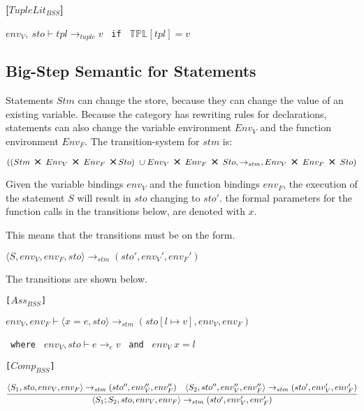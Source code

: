 \textbf{[$TupleLit_{BSS}$]}\\
\begin{center}
	\begin{math}
	env_V,\ sto \vdash tpl \rightarrow_{tuple} v
	\end{math}
	\texttt{ if } $\mathbb{TPL}[tpl] = v$
\end{center}

\subsection{Big-Step Semantic for Statements}
Statements $Stm$ can change the store, because they can change the value of an existing variable.
Because the category has rewriting rules for declarations, statements can also change the variable environment $Env_V$ and the function environment $Env_F$.
The transition-system for $stm$ is:
\begin{center}
	$((Stm\ \Cross\ Env_V\ \Cross\ Env_F\ \Cross Sto)\ \cup Env_V\ \Cross\ Env_F\ \Cross\ Sto, \rightarrow_{stm}, Env_V\ \Cross\ Env_F\ \Cross\ Sto)$
\end{center}
Given the variable bindings $env_V$ and the function bindings $env_F$, the execution of the statement $S$ will 
result in $sto$ changing to $sto'$.
the formal parameters for the function calls in the transitions below, are denoted with $x$.

This means that the transitions must be on the form.

\begin{center}
	\begin{math}
		{\langle S, env_V, env_F, sto \rangle \rightarrow_{stm} (sto', env_V', env_F')}
	\end{math}
\end{center}

The transitions are shown below.

\texttt{[$Ass_{BSS}$]}\\
\begin{center}
	\begin{math}
		{env_V, env_F \vdash \langle x = e, sto \rangle \rightarrow_{stm} (sto[l \mapsto v], env_V, env_F)}
	\end{math}
	
	\texttt{ where } $env_V, sto \vdash e \rightarrow_e v$
	\texttt{ and } $env_V\ x = l$
\end{center}

\texttt{[$Comp_{BSS}$]}\\
\begin{center}
	\begin{math}
		\cfrac
			{\langle S_1, sto, env_V, env_F \rangle \rightarrow_{stm} (sto'', env_V'', env_F'') \quad \langle S_2, sto'', env_V'', env_F'' \rangle \rightarrow_{stm} (sto', env_V', env_F')}
			{\langle S_1; S_2, sto, env_V, env_F \rangle \rightarrow_{stm} (sto', env_V', env_F')}
	\end{math}
\end{center}

